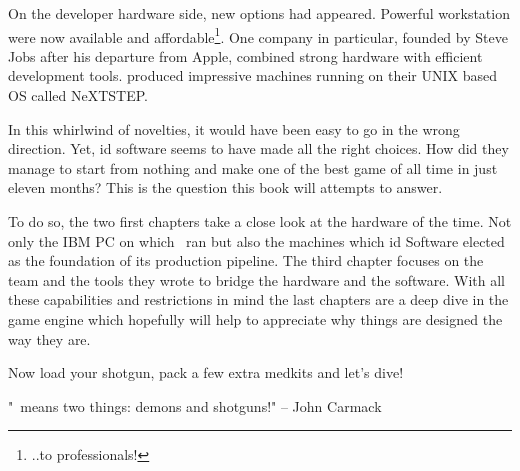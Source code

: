  \par
 On the developer hardware side, new options had appeared. Powerful workstation were now available and affordable\footnote{..to professionals!}. One company in particular, founded by Steve Jobs after his departure from Apple, combined strong hardware with efficient development tools. \NeXT produced impressive machines running on their UNIX based OS called NeXTSTEP.\\%
 \par
 In this whirlwind of novelties, it would have been easy to go in the wrong direction. Yet, id software seems to have made all the right choices. How did they manage to start from nothing and make one of the best game of all time in just eleven months? This is the question this book will attempts to answer.\\
 \par
 To do so, the two first chapters take a close look at the hardware of the time. Not only the IBM PC on which \doom~ran but also the \NeXT machines which id Software elected as the foundation of its production pipeline. The third chapter focuses on the team and the tools they wrote to bridge the hardware and the software. With all these capabilities and restrictions in mind the last chapters are a deep dive in the game engine which hopefully will help to appreciate why things are designed the way they are.\\
\par
Now load your shotgun, pack a few extra medkits and let's dive!\\
\par
\centering "\doom~means two things: demons and shotguns!" -- John Carmack

